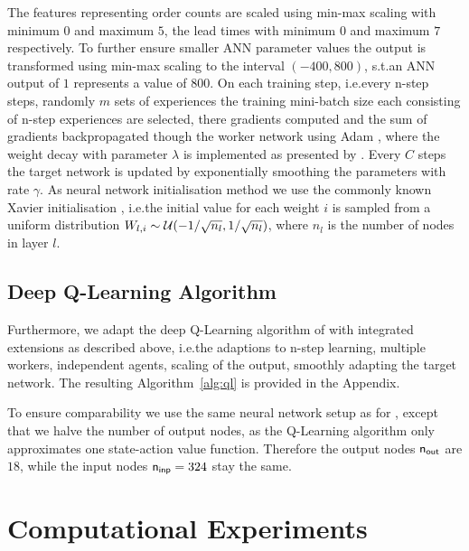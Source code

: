 \documentclass[envcountsame]{llncs}
\begin{document}
The features representing order counts are scaled using min-max scaling with minimum \(0\) and
maximum \(5\), the lead times with minimum \(0\) and maximum \(7\) respectively.
To further ensure smaller ANN parameter values the output is transformed using min-max scaling to
the interval \((-400, 800)\), s.t.\@ an ANN output of \(1\) represents a value of \(800\).
%
On each training step, i.e.\@ every n-step steps, randomly \(m\) sets of experiences the training
mini-batch size each consisting of n-step experiences are selected, there gradients computed and the
sum of gradients backpropagated though the worker network using Adam \citep{kingma2014adam}, where
the weight decay with parameter \(\lambda\) is implemented as presented by
\citet{loshchilov2017decoupled}.
%
Every \(C\) steps the target network is updated by exponentially smoothing the parameters with rate
\(\gamma\).
%
As neural network
initialisation method we use the commonly known Xavier initialisation
\citep{glorot2010understanding}, i.e.\@ the initial value for each weight \(i\) is sampled from a
uniform distribution \(W_{l,i} \sim \mathcal{U}(-1/\sqrt{n_l},1/\sqrt{n_l})\), where \(n_{l}\) is the
number of nodes in layer \(l\).
%


\subsection{Deep Q-Learning Algorithm}

Furthermore, we adapt the deep Q-Learning algorithm of \citet{mnih2015human} with integrated
extensions as described above, i.e.\@ the adaptions to n-step learning, multiple workers,
independent agents, scaling of the output, smoothly adapting the target network. The resulting
Algorithm~\ref{alg:ql} is provided in the Appendix.

To ensure comparability we use the same neural network setup as for \ARA{}, except that we halve the
number of output nodes, as the Q-Learning algorithm only approximates one state-action value
function. Therefore the output nodes \(\mathsf{n_{out}}\) are \(18\), while the input nodes \(\mathsf{n_{inp}}=324\)
stay the same.


\section{Computational Experiments}
\label{sec:Computational}
\end{document}
